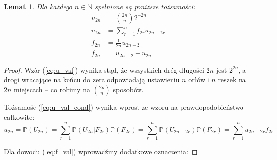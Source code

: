 \documentclass[a4paper,11pt,twoside]{book}
\newcommand{\Prob}{\mathbb{P}}
\newtheorem{lemat}[twier]{Lemat}
\theoremstyle{definition}
\begin{document}
\begin{lemat}
 \label{lem:uf_val}
 Dla każdego $n \in \mathbb{N}$ spełnione są poniższe tożsamości:
 \begin{align}
  u_{2n} &= \binom{2n}{n}2^{-2n}   \label{eq:u_val}\\
  u_{2n} &= \sum_{r=1}^n f_{2r} u_{2n-2r}   \label{eq:u_val_cond}\\
  f_{2n} &= \frac{1}{2n} u_{2n-2} \label{eq:f_val}\\
  f_{2n} &= u_{2n-2} - u_{2n} \label{eq:f_val2}
 \end{align}
\end{lemat}
\begin{proof}
 Wzór (\ref{eq:u_val}) wynika stąd, że wszystkich dróg długości $2n$ jest $2^{2n}$, a drogi wracające na końcu do zera odpowiadają ustawieniu $n$ orłów i $n$ reszek na $2n$ miejscach -- co robimy na $\binom{2n}{n}$ sposobów.
 
 Tożsamość (\ref{eq:u_val_cond}) wynika wprost ze wzoru na prawdopodobieństwo całkowite:
 \[ u_{2n} = \Prob(U_{2n}) = \sum_{r=1}^n \Prob(U_{2n}|F_{2r}) \Prob(F_{2r}) = \sum_{r=1}^n \Prob(U_{2n-2r}) \Prob(F_{2r}) = \sum_{r=1}^n u_{2n-2r}f_{2r}  \]
 
 Dla dowodu (\ref{eq:f_val}) wprowadźmy dodatkowe oznaczenia:
 

\end{proof}
\end{document}

